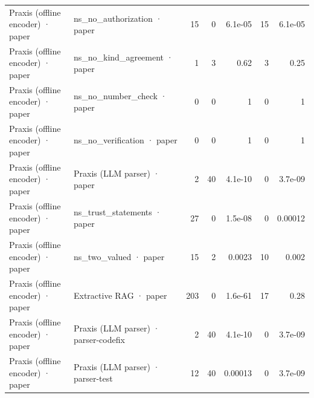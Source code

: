 \begin{tabular}{llrrrrr}
Praxis (offline encoder) · paper & ns_no_authorization · paper & 15 & 0 & 6.1e-05 & 15 & 6.1e-05 \\
Praxis (offline encoder) · paper & ns_no_kind_agreement · paper & 1 & 3 & 0.62 & 3 & 0.25 \\
Praxis (offline encoder) · paper & ns_no_number_check · paper & 0 & 0 & 1 & 0 & 1 \\
Praxis (offline encoder) · paper & ns_no_verification · paper & 0 & 0 & 1 & 0 & 1 \\
Praxis (offline encoder) · paper & Praxis (LLM parser) · paper & 2 & 40 & 4.1e-10 & 0 & 3.7e-09 \\
Praxis (offline encoder) · paper & ns_trust_statements · paper & 27 & 0 & 1.5e-08 & 0 & 0.00012 \\
Praxis (offline encoder) · paper & ns_two_valued · paper & 15 & 2 & 0.0023 & 10 & 0.002 \\
Praxis (offline encoder) · paper & Extractive RAG · paper & 203 & 0 & 1.6e-61 & 17 & 0.28 \\
Praxis (offline encoder) · paper & Praxis (LLM parser) · parser-codefix & 2 & 40 & 4.1e-10 & 0 & 3.7e-09 \\
Praxis (offline encoder) · paper & Praxis (LLM parser) · parser-test & 12 & 40 & 0.00013 & 0 & 3.7e-09 \\
\bottomrule
\end{tabular}
